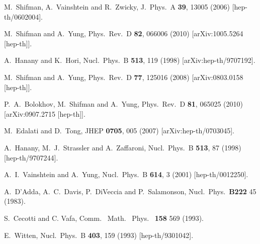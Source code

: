 \documentclass[12pt]{article}
\newcommand{\ntwo}{${\mathcal N}=2$}
\begin{document}
\begin{thebibliography}{99}
  M.~Shifman, A.~Vainshtein and R.~Zwicky,
  J.\ Phys.\ A {\bf 39}, 13005 (2006)
  [hep-th/0602004].
 
  M.~Shifman and A.~Yung,
  Phys.\ Rev.\ D {\bf 82}, 066006 (2010)
  [arXiv:1005.5264 [hep-th]].

  A.~Hanany and K.~Hori,
  Nucl.\ Phys.\  B {\bf 513}, 119 (1998)
  [arXiv:hep-th/9707192].
  
  M.~Shifman and A.~Yung,
  Phys.\ Rev.\  D {\bf 77}, 125016 (2008)
  [arXiv:0803.0158 [hep-th]].

  P.~A.~Bolokhov, M.~Shifman and A.~Yung,
  Phys.\ Rev.\  D {\bf 81}, 065025 (2010)
  [arXiv:0907.2715 [hep-th]].
  
  M.~Edalati and D.~Tong,
  JHEP {\bf 0705}, 005 (2007)
  [arXiv:hep-th/0703045].
  
  A.~Hanany, M.~J.~Strassler and A.~Zaffaroni,
  Nucl.\ Phys.\ B {\bf 513}, 87 (1998)
  [hep-th/9707244].

  A.~I.~Vainshtein and A.~Yung,
  Nucl.\ Phys.\ B {\bf 614}, 3 (2001)
  [hep-th/0012250].

  
  A.~D'Adda, A.~C.~Davis, P.~DiVeccia and P.~Salamonson,
  Nucl.\ Phys.\ {\bf B222} 45 (1983).
   
  S.~Cecotti and C. Vafa,
  Comm. \ Math. \ Phys. \ {\bf 158} 569 (1993).

  E.~Witten,
  Nucl.\ Phys.\ B {\bf 403}, 159 (1993)
  [hep-th/9301042].

  
\end{thebibliography}
\end{document}
